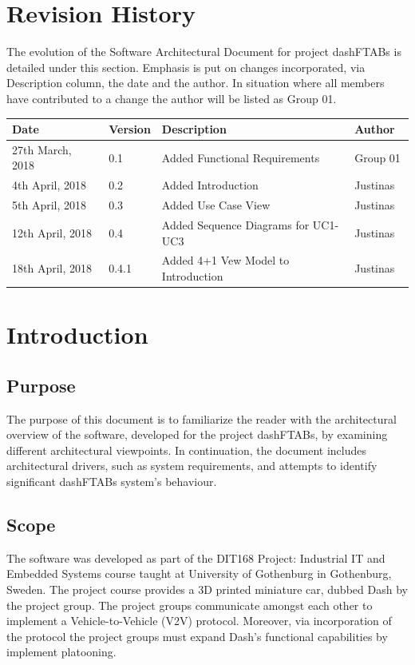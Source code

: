 \documentclass[12pt]{article}
\begin{document}
\section{Revision History}
The evolution of the Software Architectural Document for project dashFTABs is detailed under this section. Emphasis is put on changes incorporated, via Description column, the date and the author. In situation where all members have contributed to a change the author will be listed as Group 01.
\begin{longtable}{ | p{0.25\linewidth} | p{0.1\linewidth} | p{0.5\linewidth} | p{0.15\linewidth} | }\hline 
    Date & Version & Description & Author \\ \hline
   	27th March, 2018 & 0.1 & Added Functional Requirements & Group 01\\ \hline
   	4th April, 2018 & 0.2 & Added Introduction & Justinas\\ \hline
   	5th April, 2018 & 0.3 & Added Use Case View & Justinas\\ \hline
   	12th April, 2018 & 0.4 & Added Sequence Diagrams for UC1-UC3 & Justinas\\ \hline
    18th April, 2018 & 0.4.1 & Added 4+1 Vew Model to Introduction & Justinas\\ \hline
\end{longtable}
\pagebreak

\section{Introduction}
\subsection{Purpose}
The purpose of this document is to familiarize the reader with the architectural overview of the software, developed for the project dashFTABs, by examining different architectural viewpoints. In continuation, the document includes architectural drivers, such as system requirements, and attempts to identify significant dashFTABs system’s behaviour.\par

\subsection{Scope}
The software was developed as part of the DIT168 Project: Industrial IT and Embedded Systems course taught at University of Gothenburg in Gothenburg, Sweden. The project course provides a 3D printed miniature car, dubbed Dash by the project group. The project groups communicate amongst each other to implement a Vehicle-to-Vehicle (V2V) protocol. Moreover, via incorporation of the protocol the project groups must expand Dash’s functional capabilities by implement platooning.\par
\end{document}
